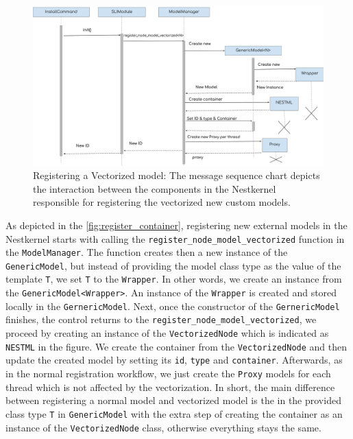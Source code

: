 \begin{figure}[h!]
\centering
\includegraphics[width=\textwidth]{src/pic/node_creation_vec.png}
\caption{Registering a Vectorized model: The message sequence chart depicts the interaction between the components in the Nestkernel responsible for registering the vectorized new custom models.}
\label{fig:register_container}
\end{figure}

As depicted in the \autoref{fig:register_container}, registering new external models in the Nestkernel starts with calling the \texttt{register\_node\_model\_vectorized} function in the \texttt{ModelManager}. The function creates then a new instance of the \texttt{GenericModel}, but instead of providing the model class type as the value of the template \texttt{T}, we set \texttt{T} to the \texttt{Wrapper}. In other words, we create an instance from the \texttt{GenericModel<Wrapper>}. An instance of the \texttt{Wrapper} is created and stored locally in the \texttt{GernericModel}. Next, once the constructor of the \texttt{GernericModel} finishes, the control returns to the \texttt{register\_node\_model\_vectorized}, we proceed by creating an instance of the \texttt{VectorizedNode} which is indicated as \texttt{NESTML} in the figure. We create the container from the \texttt{VectorizedNode} and then update the created model by setting its \texttt{id}, \texttt{type} and \texttt{container}. Afterwards, as in the normal registration workflow, we just create the \texttt{Proxy} models for each thread which is not affected by the vectorization. In short, the main difference between registering a normal model and vectorized model is the in the provided class type \texttt{T} in \texttt{GenericModel} with the extra step of creating the container as an instance of the \texttt{VectorizedNode} class, otherwise everything stays the same.


